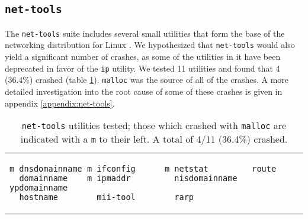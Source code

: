 \subsection{\texttt{net-tools}}
The \texttt{net-tools} suite includes several small utilities that form the base of the networking distribution for Linux \cite{nettools}. We hypothesized that \texttt{net-tools} would also yield a significant number of crashes, as some of the utilities in it have been deprecated in favor of the \texttt{ip} utility. We tested 11 utilities and found that 4 (36.4\%) crashed (table \ref{lst:net-tools}). \texttt{malloc} was the source of all of the crashes. A more detailed investigation into the root cause of some of these crashes is given in appendix \ref{appendix:net-tools}.

\begin{table}[h]
\begin{tabular}{l}
\begin{lstlisting}
m dnsdomainname m ifconfig      m netstat         route
  domainname    m ipmaddr         nisdomainname   ypdomainname
  hostname        mii-tool        rarp
\end{lstlisting}
\end{tabular}
\label{lst:net-tools}
\caption{\texttt{net-tools} utilities tested; those which crashed with \texttt{malloc} are indicated with a \texttt{m} to their left. A total of 4/11 (36.4\%) crashed.}
\end{table}